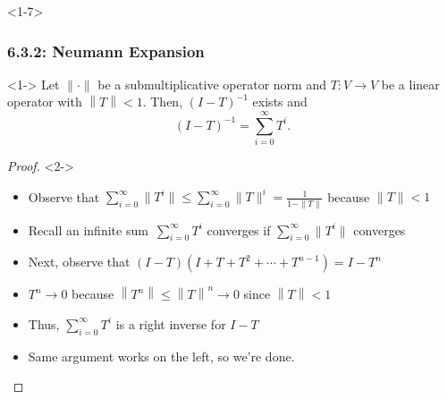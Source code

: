 \documentclass[10pt,english,aspectratio=169]{beamer}
\begin{document}
\begin{frame}<1-7> \frametitle{6.3.2: Neumann Expansion}

\vspace{-1mm}

\begin{theorem}<1->
Let $\| \cdot \|$ be a submultiplicative operator norm and $T \colon V \rightarrow V$ be a linear operator with $\left\| T \right\| < 1$.
Then, $(I-T)^{-1}$ exists and \vspace{-2mm}
\[ (I-T)^{-1} = \sum_{i=0}^{\infty} T^i. \]
\end{theorem}
\begin{proof}<2->
\begin{itemize}
\item<2-> Observe that $\sum_{i=0}^{\infty} \| T^i \| \leq \sum_{i=0}^{\infty} \| T \|^i = \frac{1}{1-\|T\|}$ because $\|T\|<1$ \vspace{1mm}

\item<3-> Recall an infinite sum $\,\sum_{i=0}^{\infty} T^i$ converges if $\sum_{i=0}^{\infty} \| T^i \|$ converges \vspace{1mm}

\item<4-> Next, observe that $(I - T) \left( I + T + T^2 + \cdots + T^{n-1} \right) = I - T^n $ \vspace{1mm}

\item<5-> $T^n \to 0$ because $ \left\| T^n \right\| \leq \left\| T \right\|^n \rightarrow 0$ since $\left\| T \right\| < 1$ \vspace{1mm}

\item<6-> Thus, $\sum_{i=0}^{\infty} T^i$ is a right inverse for $I-T$ \vspace{1mm}

\item<7-> Same argument works on the left, so we're done. \hfill \qedhere

\end{itemize}
\end{proof}

\end{frame}
\end{document}
